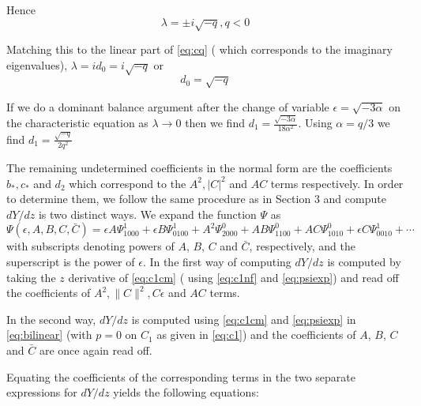 Hence
\begin{equation}
\lambda = \pm i \sqrt{-q}, q < 0
\end{equation}

Matching this to the linear part of \eqref{eq:cq} ( which corresponds to the imaginary eigenvalues), $\lambda = i d_0 = i \sqrt{-q}$ or 
\begin{equation}
d_0 = \sqrt{-q}
\end{equation}


If we do a dominant balance argument after the change of variable $\epsilon = \sqrt{-3 \alpha}$ on the characteristic equation as $\lambda \rightarrow 0 $ then we find $d_1 = \frac{ \sqrt{-3 \alpha} }{18 \alpha^2 } $. Using $\alpha=q/3$ we find $d_1 = \frac{\sqrt{-q}}{2 q^2} $ 

The remaining undetermined coefficients  in the normal form are the 
coefficients $b_*,c_*$ and $d_2$ 
which correspond to the $A^2, |C|^2$ and $AC$ terms respectively. In 
order to determine them, we follow the same procedure as 
in Section 3 and compute $dY/dz$ is two distinct ways. We expand the
function $\Psi$ as
\begin{equation}\label{eq:psiexp}
\Psi(\epsilon,A,B,C,\bar{C}) = \epsilon A \Psi_{1000}^1 + \epsilon B \Psi_{0100}^1 + A^2 \Psi_{2000}^0 + A B \Psi_{1100}^0 + A C \Psi_{1010}^0 + \epsilon C \Psi_{0010}^1 + \cdots 
\end{equation}
with subscripts denoting powers of $A$, $B$, $C$ and $\bar{C}$, respectively,
and the superscript is the power of $\epsilon$. In the first way of computing
$dY/dz$ is computed by taking the $z$ derivative of \eqref{eq:c1cm} ( 
using \eqref{eq:c1nf} and \eqref{eq:psiexp}) and read off the coefficients
of $A^2, \|C\|^2, C \epsilon$ and $AC$ terms.

In the second way, $dY/dz$ is computed using 
\eqref{eq:c1cm} and \eqref{eq:psiexp} in \eqref{eq:bilinear} 
(with $p=0$ on $C_1$ as given in \eqref{eq:c1})
and the coefficients of  $A$, $B$, $C$ and $\bar{C}$ are once
again read off.

Equating the coefficients of the corresponding terms in the two
separate expressions for $dY/dz$ yields the following equations:

